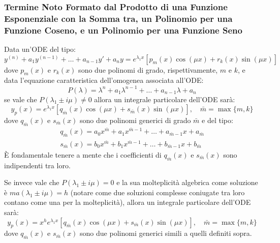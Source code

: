 \documentclass[a4paper,11pt]{article}
\begin{document}
\subsubsection[\texorpdfstring{$f(x)$ da Esponenziale, Polinomio e Trig.}{f(x) da Esponenziale, Polinomio e Trig.}]{Termine Noto Formato dal Prodotto di una Funzione Esponenziale con la Somma tra, un Polinomio per una Funzione Coseno, e un Polinomio per una Funzione Seno}
Data un'ODE del tipo:
\begin{equation*}
    y^{(n)} + a_1y^{(n-1)} + \ldots + a_{n-1}y' + a_ny = e^{\lambda_1 x}[p_m(x)\cos(\mu x) + r_k(x)\sin(\mu x)]
\end{equation*}
dove $p_m(x)$ e $r_k(x)$ sono due polinomi di grado, rispettivamente, $m$ e $k$, e data l'equazione caratteristica dell'omogenea associata all'ODE:
\begin{equation*}
    P(\lambda) = \lambda^n + a_1\lambda^{n-1} + \ldots + a_{n-1}\lambda + a_n
\end{equation*}
se vale che $P(\lambda_1 \pm i\mu) \neq 0$ allora un integrale particolare dell'ODE sarà:
\begin{equation*}
    y_p(x) = e^{\lambda_1 x}[q_{\bar{m}}(x)\cos(\mu x) + s_{\bar{m}}(x)\sin(\mu x)], \quad \bar{m} = \max\{m,k\}
\end{equation*}
dove $q_{\bar{m}}(x)$ e $s_{\bar{m}}(x)$ sono due polinomi generici di grado $\bar{m}$ e del tipo:
\begin{equation*}
    \begin{array}{l}
    q_{\bar{m}}(x) = a_0x^{\bar{m}} + a_1x^{\bar{m}-1} + \ldots + a_{\bar{m}-1}x+a_{\bar{m}} \\
    s_{\bar{m}}(x) = b_0x^{\bar{m}} + b_1x^{\bar{m}-1} + \ldots + b_{\bar{m}-1}x+b_{\bar{m}}
    \end{array}
\end{equation*}
È fondamentale tenere a mente che i coefficienti di $q_{\bar{m}}(x)$ e $s_{\bar{m}}(x)$ sono indipendenti tra loro.

Se invece vale che $P(\lambda_1\pm i\mu) = 0$ e la sua molteplicità algebrica come soluzione è $ma(\lambda_1\pm i\mu) = h$ (notare come due soluzioni complesse coniugate tra loro contano come una per la molteplicità), allora un integrale particolare dell'ODE sarà:
\begin{equation*}
    y_p(x) = x^he^{\lambda_1 x}[q_{\bar{m}}(x)\cos(\mu x) + s_{\bar{m}}(x)\sin(\mu x)], \quad \bar{m} = \max\{m,k\}
\end{equation*}
dove $q_{\bar{m}}(x)$ e $s_{\bar{m}}(x)$ sono due polinomi generici simili a quelli definiti sopra.
\end{document}
